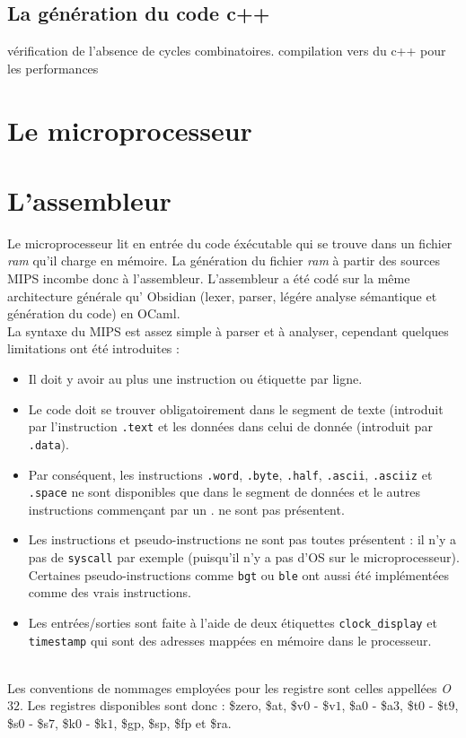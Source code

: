 \documentclass[13pt]{article}
\begin{document}
\subsection{La génération du code c++}
vérification de l'absence de cycles combinatoires.
compilation vers du c++ pour les performances


\section{Le microprocesseur}

\section{L'assembleur}

Le microprocesseur lit en entrée du code éxécutable qui se trouve dans un
fichier \emph{ram} qu'il charge en mémoire. La génération du fichier \emph{ram}
à partir des sources MIPS incombe donc à l'assembleur. L'assembleur a été codé
sur la même architecture générale qu' Obsidian (lexer, parser, légére analyse
sémantique et génération du code) en OCaml. \\
La syntaxe du MIPS est assez simple à parser et à analyser, cependant quelques
limitations ont été introduites : 
\begin{itemize}
\item Il doit y avoir au plus une instruction ou étiquette par ligne.
\item Le code doit se trouver obligatoirement dans le segment de texte
  (introduit par l'instruction \texttt{.text} et les données dans celui de
  donnée (introduit par \texttt{.data}). 
\item Par conséquent, les instructions \texttt{.word}, \texttt{.byte},
  \texttt{.half}, \texttt{.ascii}, \texttt{.asciiz} et \texttt{.space} ne sont
  disponibles que dans le segment de données et le autres instructions
  commençant par un \og .\fg{} ne sont pas présentent.
\item Les instructions et pseudo-instructions ne sont pas toutes présentent :
  il n'y a pas de \texttt{syscall} par exemple (puisqu'il n'y a pas d'OS sur le
  microprocesseur). Certaines pseudo-instructions comme \texttt{bgt} ou
  \texttt{ble} ont aussi été implémentées comme des vrais instructions.
\item Les entrées/sorties sont faite à l'aide de deux étiquettes
  \texttt{clock\_display} et \texttt{timestamp} qui sont des adresses mappées en
  mémoire dans le processeur.
\end{itemize}
\text{}\\
Les conventions de nommages employées pour les registre sont celles appellées
\emph{O$32$}. Les registres disponibles sont donc : \$zero, \$at, \$v$0$ -
\$v$1$, \$a$0$ - \$a$3$, \$t$0$ - \$t$9$, \$s$0$ - \$s$7$, \$k$0$ - \$k$1$,
\$gp, \$sp, \$fp et \$ra.
\end{document}
